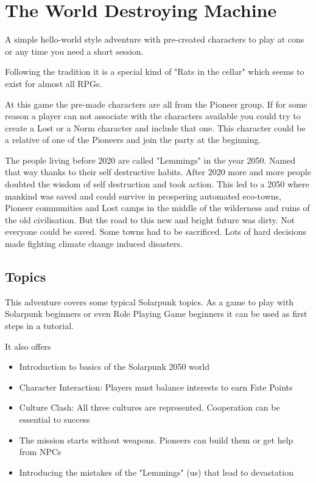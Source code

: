 \chapter{The World Destroying Machine}
\label{ch:the world destroying machine}

A simple hello-world style adventure with pre-created characters to play at cons or any time you need a short session.

Following the tradition it is a special kind of "Rats in the cellar" which seems to exist for almost all RPGs.

At this game the pre-made characters are all from the Pioneer group. If for some reason a player can not associate with the characters available you could try to create a Lost or a Norm character and include that one. This character could be a relative of one of the Pioneers and join the party at the beginning.

\begin{sidebarBox}[title=Dirty Road to Eden]

The people living before 2020 are called "Lemmings" in the year 2050. Named that way thanks to their self destructive habits. After 2020 more and more people doubted the wisdom of self destruction and took action. This led to a 2050 where mankind was saved and could survive in prospering automated eco-towns, Pioneer communities and Lost camps in the middle of the wilderness and ruins of the old civilisation. But the road to this new and bright future was dirty. Not everyone could be saved. Some towns had to be sacrificed. Lots of hard decisions made fighting climate change induced disasters.

\end{sidebarBox}

\section{Topics}

This adventure covers some typical Solarpunk topics. As a game to play with Solarpunk beginners or even Role Playing Game beginners it can be used as first steps in a tutorial.

It also offers

\begin{itemize}
\item Introduction to basics of the Solarpunk 2050 world
\item Character Interaction: Players must balance interests to earn Fate Points
\item Culture Clash: All three cultures are represented. Cooperation can be essential to success
\item The mission starts without weapons. Pioneers can build them or get help from NPCs
\item Introducing the mistakes of the "Lemmings" (us) that lead to devastation
\end{itemize}

